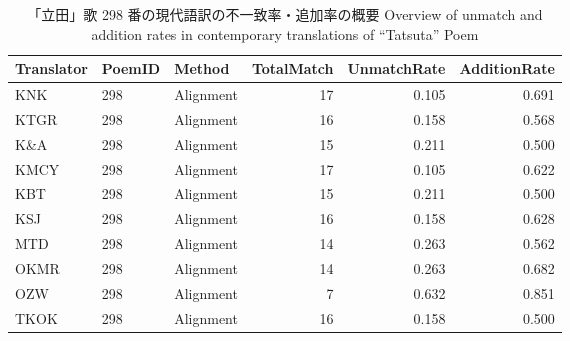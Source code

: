 \documentclass[
  letterpaper,
  DIV=11,
  numbers=noendperiod]{scrartcl}
\begin{document}
\begin{longtable}[]{@{}lllrrr@{}}

\caption{\label{tbl-tatsuta-review}「立田」歌 298
番の現代語訳の不一致率・追加率の概要 Overview of unmatch and addition
rates in contemporary translations of ``Tatsuta'' Poem}

\tabularnewline

\toprule\noalign{}
Translator & PoemID & Method & TotalMatch & UnmatchRate &
AdditionRate \\
\midrule\noalign{}
\endhead
\bottomrule\noalign{}
\endlastfoot
KNK & 298 & Alignment & 17 & 0.105 & 0.691 \\
KTGR & 298 & Alignment & 16 & 0.158 & 0.568 \\
K\&A & 298 & Alignment & 15 & 0.211 & 0.500 \\
KMCY & 298 & Alignment & 17 & 0.105 & 0.622 \\
KBT & 298 & Alignment & 15 & 0.211 & 0.500 \\
KSJ & 298 & Alignment & 16 & 0.158 & 0.628 \\
MTD & 298 & Alignment & 14 & 0.263 & 0.562 \\
OKMR & 298 & Alignment & 14 & 0.263 & 0.682 \\
OZW & 298 & Alignment & 7 & 0.632 & 0.851 \\
TKOK & 298 & Alignment & 16 & 0.158 & 0.500 \\

\end{longtable}
\end{document}
